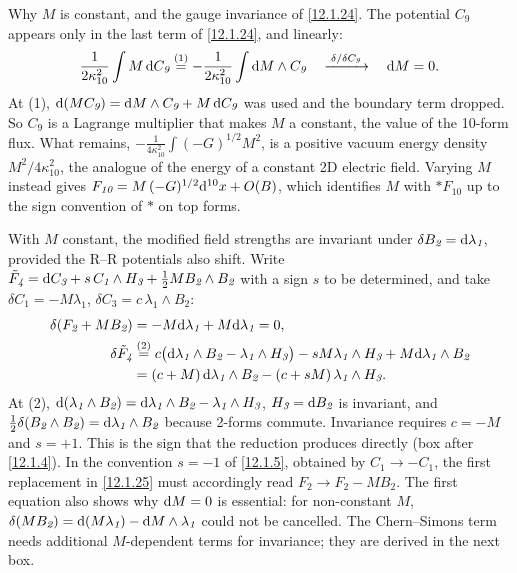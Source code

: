 \begin{tcolorbox}[breakable]
	\begin{remark}
		Why $M$ is constant, and the gauge invariance of \eqref{12.1.24}. The potential $C_{\textit{9}}$ appears only in the last term of \eqref{12.1.24}, and linearly:
		\begin{align*}
			\frac{1}{2\kappa_{10}^{2}}\int M\,\mathrm{d} C_{\textit{9}}
			\overset{(1)}{=} -\frac{1}{2\kappa_{10}^{2}}\int \mathrm{d} M\wedge C_{\textit{9}}
			\quad\xrightarrow{\;\delta/\delta C_{\textit{9}}\;}\quad \mathrm{d} M=0 .
		\end{align*}
		At (1), $\mathrm{d}(M C_{\textit{9}})=\mathrm{d} M\wedge C_{\textit{9}}+M\,\mathrm{d} C_{\textit{9}}$ was used and the boundary term dropped. So $C_{\textit{9}}$ is a Lagrange multiplier that makes $M$ a constant, the value of the 10-form flux. What remains, $-\frac{1}{4\kappa_{10}^{2}}\int(-G)^{1/2}M^{2}$, is a positive vacuum energy density $M^{2}/4\kappa_{10}^{2}$, the analogue of the energy of a constant 2D electric field. Varying $M$ instead gives $F_{\textit{10}}=M\,(-G)^{1/2}\mathrm{d}^{10}x+O(B)$, which identifies $M$ with $\ast F_{\textit{10}}$ up to the sign convention of $\ast$ on top forms.

		With $M$ constant, the modified field strengths are invariant under $\delta B_{\textit{2}}=\mathrm{d}\lambda_{\textit{1}}$, provided the R--R potentials also shift. Write $\tilde F_{\textit{4}}=\mathrm{d} C_{\textit{3}}+s\,C_{\textit{1}}\wedge H_{\textit{3}}+\frac12 MB_{\textit{2}}\wedge B_{\textit{2}}$ with a sign $s$ to be determined, and take $\delta C_{\textit{1}}=-M\lambda_{\textit{1}}$, $\delta C_{\textit{3}}=c\,\lambda_{\textit{1}}\wedge B_{\textit{2}}$:
		\begin{align*}
			\delta(F_{\textit{2}}+MB_{\textit{2}})&=-M\mathrm{d}\lambda_{\textit{1}}+M\mathrm{d}\lambda_{\textit{1}}=0,\\
			\delta\tilde F_{\textit{4}}&\overset{(2)}{=} c\bigl(\mathrm{d}\lambda_{\textit{1}}\wedge B_{\textit{2}}-\lambda_{\textit{1}}\wedge H_{\textit{3}}\bigr)-sM\lambda_{\textit{1}}\wedge H_{\textit{3}}+M\mathrm{d}\lambda_{\textit{1}}\wedge B_{\textit{2}}\\
			&=(c+M)\,\mathrm{d}\lambda_{\textit{1}}\wedge B_{\textit{2}}-(c+sM)\,\lambda_{\textit{1}}\wedge H_{\textit{3}} .
		\end{align*}
		At (2), $\mathrm{d}(\lambda_{\textit{1}}\wedge B_{\textit{2}})=\mathrm{d}\lambda_{\textit{1}}\wedge B_{\textit{2}}-\lambda_{\textit{1}}\wedge H_{\textit{3}}$, $H_{\textit{3}}=\mathrm{d} B_{\textit{2}}$ is invariant, and $\frac12\delta(B_{\textit{2}}\wedge B_{\textit{2}})=\mathrm{d}\lambda_{\textit{1}}\wedge B_{\textit{2}}$ because 2-forms commute. Invariance requires $c=-M$ and $s=+1$. This is the sign that the reduction produces directly (box after \eqref{12.1.4}). In the convention $s=-1$ of \eqref{12.1.5}, obtained by $C_{\textit{1}}\to-C_{\textit{1}}$, the first replacement in \eqref{12.1.25} must accordingly read $F_{\textit{2}}\to F_{\textit{2}}-MB_{\textit{2}}$. The first equation also shows why $\mathrm{d} M=0$ is essential: for non-constant $M$, $\delta(MB_{\textit{2}})=\mathrm{d}(M\lambda_{\textit{1}})-\mathrm{d} M\wedge\lambda_{\textit{1}}$ could not be cancelled. The Chern--Simons term needs additional $M$-dependent terms for invariance; they are derived in the next box.
	\end{remark}
\end{tcolorbox}
